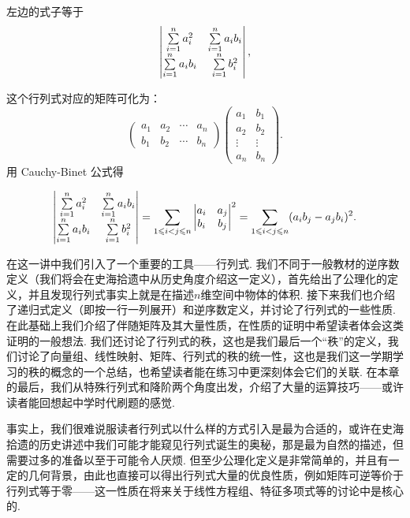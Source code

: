 \begin{solution}
    左边的式子等于
    \[ \begin{vmatrix}
        \sum_{i=1}^{n}\limits a_i^2 & \sum_{i=1}^{n}\limits a_i b_i \\
        \sum_{i=1}^{n}\limits a_i b_i & \sum_{i=1}^{n}\limits b_i^2
    \end{vmatrix}, \]

    这个行列式对应的矩阵可化为：
    \[ \begin{pmatrix}
        a_1 & a_2 & \cdots & a_n \\
        b_1 & b_2 & \cdots & b_n
    \end{pmatrix}
    \begin{pmatrix}
        a_1 & b_1 \\
        a_2 & b_2 \\
        \vdots & \vdots \\
        a_n & b_n
    \end{pmatrix}. \]
    用 Cauchy-Binet 公式得

    \[
    \begin{vmatrix}
        \sum_{i=1}^{n}\limits a_i^2 & \sum_{i=1}^{n}\limits a_i b_i \\
        \sum_{i=1}^{n}\limits a_i b_i & \sum_{i=1}^{n}\limits b_i^2
    \end{vmatrix}
    = \sum_{1 \leqslant i < j \leqslant n}
    \begin{vmatrix}
        a_i & a_j \\
        b_i & b_j
    \end{vmatrix}^2
    = \sum_{1 \leqslant i < j \leqslant n} (a_i b_j - a_j b_i)^2.
    \]
\end{solution}

\begin{summary}

    在这一讲中我们引入了一个重要的工具——行列式. 我们不同于一般教材的逆序数定义（我们将会在史海拾遗中从历史角度介绍这一定义），首先给出了公理化的定义，并且发现行列式事实上就是在描述$n$维空间中物体的体积. 接下来我们也介绍了递归式定义（即按一行一列展开）和逆序数定义，并讨论了行列式的一些性质. 在此基础上我们介绍了伴随矩阵及其大量性质，在性质的证明中希望读者体会这类证明的一般想法. 我们还讨论了行列式的秩，这也是我们最后一个``秩''的定义，我们讨论了向量组、线性映射、矩阵、行列式的秩的统一性，这也是我们这一学期学习的秩的概念的一个总结，也希望读者能在练习中更深刻体会它们的关联. 在本章的最后，我们从特殊行列式和降阶两个角度出发，介绍了大量的运算技巧——或许读者能回想起中学时代刷题的感觉.

    事实上，我们很难说服读者行列式以什么样的方式引入是最为合适的，或许在史海拾遗的历史讲述中我们可能才能窥见行列式诞生的奥秘，那是最为自然的描述，但需要过多的准备以至于可能令人厌烦. 但至少公理化定义是非常简单的，并且有一定的几何背景，由此也直接可以得出行列式大量的优良性质，例如矩阵可逆等价于行列式等于零——这一性质在将来关于线性方程组、特征多项式等的讨论中是核心的.

\end{summary}

